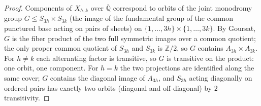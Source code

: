 \begin{proof}
Components of $X_{h,k}$ over $\overline{\mathbb Q}$ correspond to orbits
of the joint monodromy group $G\le S_{3h}\times S_{3k}$ (the image of
the fundamental group of the common punctured base acting on pairs of
sheets) on $\{1,\dots,3h\}\times\{1,\dots,3k\}$.  By Goursat, $G$ is the
fiber product of the two full symmetric images over a common quotient;
the only proper common quotient of $S_{3h}$ and $S_{3k}$ is
$\mathbb Z/2$, so $G$ contains $A_{3h}\times A_{3k}$.  For $h\ne k$
each alternating factor is transitive, so $G$ is transitive on the
product: one orbit, one component.  For $h=k$ the two projections are
identified along the same cover; $G$ contains the diagonal image of
$A_{3h}$, and $S_{3h}$ acting diagonally on ordered pairs has exactly
two orbits (diagonal and off-diagonal) by $2$-transitivity.
\end{proof}

